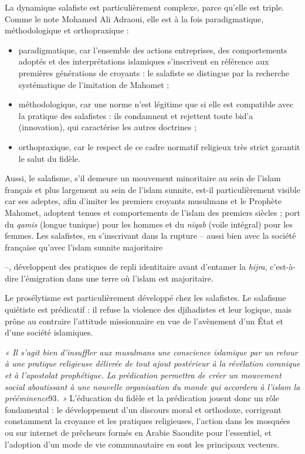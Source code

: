 La dynamique salafiste est particulièrement complexe, parce qu'elle est
triple. Comme le note Mohamed Ali Adraoui, elle est à la fois
paradigmatique, méthodologique et orthopraxique :


\begin{itemize}
\item
  paradigmatique, car l'ensemble des actions entreprises, des
  comportements adoptés et des interprétations islamiques s'inscrivent
  en référence aux premières générations de croyants : le salafiste se
  distingue par la recherche systématique de l'imitation de Mahomet ;
\item
  méthodologique, car une norme n'est légitime que si elle est
  compatible avec la pratique des salafistes : ils condamnent et
  rejettent toute bid'a (innovation), qui caractérise les autres
  doctrines ;
\item
  
  orthopraxique, car le respect de ce cadre normatif religieux très
  strict garantit le salut du fidèle.
  
\end{itemize}


Aussi, le salafisme, s'il demeure un mouvement minoritaire au sein de
l'islam français et plus largement au sein de l'islam sunnite, est-il
particulièrement visible car ses adeptes, afin d'imiter les premiers
croyants musulmans et le Prophète Mahomet, adoptent tenues et
comportements de l'islam des premiers siècles ; port du \emph{qamis}
(longue tunique) pour les hommes et du \emph{niqab} (voile intégral)
pour les femmes. Les salafistes, en s'inscrivant dans la rupture --
aussi bien avec la société française qu'avec l'islam sunnite majoritaire



--, développent des pratiques de repli identitaire avant d'entamer la
\emph{hijra}, c'est-à-dire l'émigration dans une terre où l'islam est
majoritaire.

Le prosélytisme est particulièrement développé chez les salafistes. Le
salafisme quiétiste est prédicatif : il refuse la violence des
djihadistes et leur logique, mais prône au contraire l'attitude
missionnaire en vue de l'avènement d'un État et d'une société
islamiques.

\emph{« Il s'agit bien d'insuffler aux musulmans une conscience
islamique par un retour à une pratique religieuse délivrée de tout ajout
postérieur à la révélation coranique et à l'apostolat prophétique. La
prédication permettra de créer un mouvement social aboutissant à une
nouvelle organisation du monde qui accordera à l'islam la
prééminence}93\emph{. »} L'éducation du fidèle et la prédication jouent
donc un rôle fondamental : le développement d'un discours moral et
orthodoxe, corrigeant constamment la croyance et les pratiques
religieuses, l'action dans les mosquées ou sur internet de prêcheurs
formés en Arabie Saoudite pour l'essentiel, et l'adoption d'un mode de
vie communautaire en sont les principaux vecteurs.

